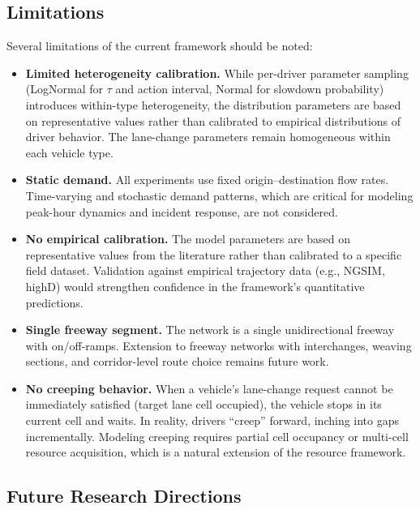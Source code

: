 \documentclass[review,authoryear]{elsarticle}
\begin{document}
\subsection{Limitations}

Several limitations of the current framework should be noted:

\begin{itemize}
    \item \textbf{Limited heterogeneity calibration.} While per-driver parameter sampling (LogNormal for $\tau$ and action interval, Normal for slowdown probability) introduces within-type heterogeneity, the distribution parameters are based on representative values rather than calibrated to empirical distributions of driver behavior. The lane-change parameters remain homogeneous within each vehicle type.

    \item \textbf{Static demand.} All experiments use fixed origin--destination flow rates. Time-varying and stochastic demand patterns, which are critical for modeling peak-hour dynamics and incident response, are not considered.

    \item \textbf{No empirical calibration.} The model parameters are based on representative values from the literature rather than calibrated to a specific field dataset. Validation against empirical trajectory data (e.g., NGSIM, highD) would strengthen confidence in the framework's quantitative predictions.

    \item \textbf{Single freeway segment.} The network is a single unidirectional freeway with on/off-ramps. Extension to freeway networks with interchanges, weaving sections, and corridor-level route choice remains future work.

    \item \textbf{No creeping behavior.} When a vehicle's lane-change request cannot be immediately satisfied (target lane cell occupied), the vehicle stops in its current cell and waits. In reality, drivers ``creep'' forward, inching into gaps incrementally. Modeling creeping requires partial cell occupancy or multi-cell resource acquisition, which is a natural extension of the resource framework.
\end{itemize}

\subsection{Future Research Directions}
\end{document}
